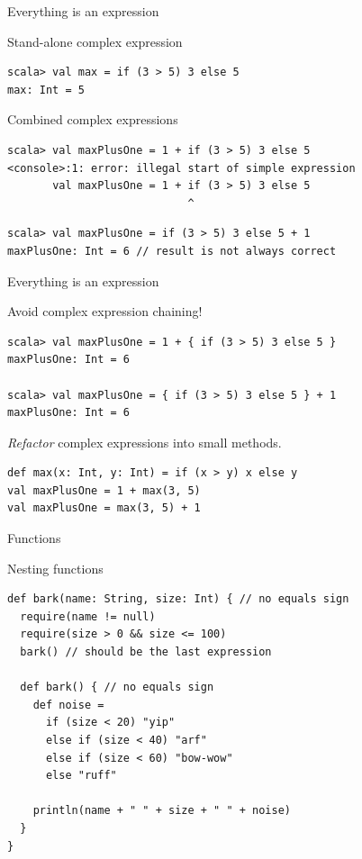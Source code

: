 \begin{frame}[fragile]{Everything is an expression}
\begin{exampleblock}{Stand-alone complex expression }
\begin{lstlisting}
scala> val max = if (3 > 5) 3 else 5
max: Int = 5
\end{lstlisting}
\end{exampleblock}
\pause
\begin{alertblock}{Combined complex expressions}
\begin{lstlisting}
scala> val maxPlusOne = 1 + if (3 > 5) 3 else 5
<console>:1: error: illegal start of simple expression
       val maxPlusOne = 1 + if (3 > 5) 3 else 5
                            ^
\end{lstlisting}
\pause
\begin{lstlisting}
scala> val maxPlusOne = if (3 > 5) 3 else 5 + 1
maxPlusOne: Int = 6 // result is not always correct
\end{lstlisting}
\end{alertblock}
\end{frame}
\begin{frame}[fragile]{Everything is an expression}
\begin{exampleblock}{\alert{Avoid} complex expression chaining!}
\begin{lstlisting}
scala> val maxPlusOne = 1 + { if (3 > 5) 3 else 5 }
maxPlusOne: Int = 6

scala> val maxPlusOne = { if (3 > 5) 3 else 5 } + 1
maxPlusOne: Int = 6
\end{lstlisting}
\end{exampleblock}
\pause
\begin{exampleblock}{\emph{Refactor} complex expressions into small methods.}
\begin{lstlisting}
def max(x: Int, y: Int) = if (x > y) x else y
val maxPlusOne = 1 + max(3, 5)
val maxPlusOne = max(3, 5) + 1
\end{lstlisting}
\end{exampleblock}
\end{frame}


\begin{frame}[fragile]{Functions}
\begin{alertblock}{Nesting functions}
\begin{lstlisting}
def bark(name: String, size: Int) { // no equals sign
  require(name != null)
  require(size > 0 && size <= 100)
  bark() // should be the last expression

  def bark() { // no equals sign
    def noise =
      if (size < 20) "yip"
      else if (size < 40) "arf"
      else if (size < 60) "bow-wow"
      else "ruff"
        
    println(name + " " + size + " " + noise)
  }
}
\end{lstlisting}
\end{alertblock}
\end{frame}

